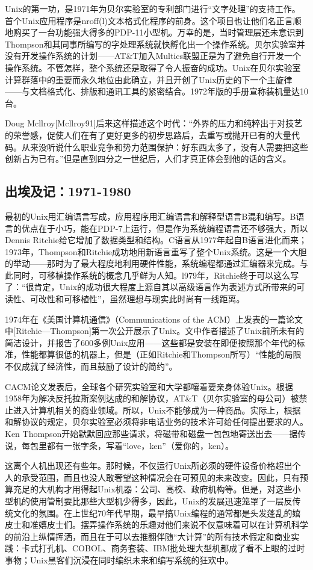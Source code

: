 \documentclass[12pt,oneside]{book}
\begin{document}
\begin{common-format}
Unix的第一功，是1971年为贝尔实验室的专利部门进行“文字处理”的支持工作。首个Unix应用程序是nroff(l)文本格式化程序的前身。这个项目也让他们名正言顺地购买了一台功能强大得多的PDP-11小型机。万幸的是，当时管理层还未意识到Thompson和其同事所编写的字处理系统就快孵化出一个操作系统。贝尔实验室并没有开发操作系统的计划——AT\&{}T加入Multics联盟正是为了避免自行开发一个操作系统。不管怎样，整个系统还是取得了令人振奋的成功。Unix在贝尔实验室计算群落中的重要而永久地位由此确立，并且开创了Unix历史的下一个主旋律——与文档格式化、排版和通讯工具的紧密结合。1972年版的手册宣称装机量达10台。

Doug Mcllroy[Mcllroy91]后来这样描述这个时代：“外界的压力和纯粹出于对技艺的荣誉感，促使人们在有了更好更多的初步思路后，去重写或抛开已有的大量代码。从来没听说什么职业竞争和势力范围保护：好东西太多了，没有人需要把这些创新占为已有。”但是直到四分之一世纪后，人们才真正体会到他的话的含义。


\subsection{出埃及记：1971-1980}
最初的Unix用汇编语言写成，应用程序用汇编语言和解释型语言B混和编写。B语言的优点在于小巧，能在PDP-7上运行，但是作为系统编程语言还不够强大，所以Dennis Ritchie给它增加了数据类型和结构。C语言从1977年起自B语言进化而来；1973年，Thompson和Ritchie成功地用新语言重写了整个Unix系统。这是一个大胆的举动——那时为了最大程度地利用硬件性能，系统编程都通过汇编器来完成。与此同时，可移植操作系统的概念几乎鲜为人知。l979年，Ritchie终于可以这么写了：“很肯定，Unix的成功很大程度上源自其以高级语言作为表述方式所带来的可读性、可改性和可移植性”，虽然理想与现实此时尚有一线距离。

1974年在《美国计算机通信》（Communications of the ACM）上发表的一篇论文中[Ritchie—Thompson]第一次公开展示了Unix。文中作者描述了Unix前所未有的简洁设计，并报告了600多例Unix应用——这些都是安装在即便按照那个年代的标准，性能都算很低的机器上，但是（正如Ritchie和Thompson所写）“性能的局限不仅成就了经济性，而且鼓励了设计的简约”。

CACM论文发表后，全球各个研究实验室和大学都嚷着要亲身体验Unix。根据1958年为解决反托拉斯案例达成的和解协议，AT\&{}T（贝尔实验室的母公司）被禁止进入计算机相关的商业领域。所以，Unix不能够成为一种商品。实际上，根据和解协议的规定，贝尔实验室必须将非电话业务的技术许可给任何提出要求的人。Ken Thompson开始默默回应那些请求，将磁带和磁盘一包包地寄送出去——据传说，每包里都有一张字条，写着“love，ken”（爱你的，ken）。

这离个人机出现还有些年。那时候，不仅运行Unix所必须的硬件设备价格超出个人的承受范围，而且也没人敢奢望这种情况会在可预见的未来改变。因此，只有预算充足的大机构才用得起Unix机器：公司、高校、政府机构等。但是，对这些小型机的使用管制要比那些大型机少得多，因此，Unix的发展迅速笼罩了一层反传统文化的氛围。在上世纪70年代早期，最早搞Unix编程的通常都是头发蓬乱的嬉皮士和准嬉皮士们。摆弄操作系统的乐趣对他们来说不仅意味着可以在计算机科学的前沿上纵情挥洒，而且在于可以去推翻伴随“大计算”的所有技术假定和商业实践：卡式打孔机、COBOL、商务套装、IBM批处理大型机都成了看不上眼的过时事物；Unix黑客们沉浸在同时编织未来和编写系统的狂欢中。


\end{common-format}
\end{document}
